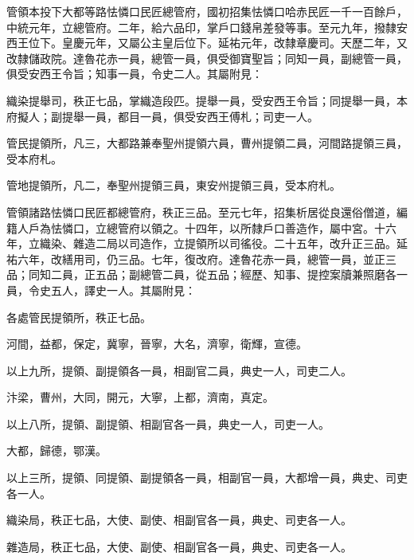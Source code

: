 \begin{pinyinscope}
 管領本投下大都等路怯憐口民匠總管府，國初招集怯憐口哈赤民匠一千一百餘戶，中統元年，立總管府。二年，給六品印，掌戶口錢帛差發等事。至元九年，撥隸安西王位下。皇慶元年，又屬公主皇后位下。延祐元年，改隸章慶司。天歷二年，又改隸儲政院。達魯花赤一員，總管一員，俱受御寶聖旨；同知一員，副總管一員，俱受安西王令旨；知事一員，令史二人。其屬附見：



 織染提舉司，秩正七品，掌織造段匹。提舉一員，受安西王令旨；同提舉一員，本府擬人；副提舉一員，都目一員，俱受安西王傅札；司吏一人。



 管民提領所，凡三，大都路兼奉聖州提領六員，曹州提領二員，河間路提領三員，受本府札。



 管地提領所，凡二，奉聖州提領三員，東安州提領三員，受本府札。



 管領諸路怯憐口民匠都總管府，秩正三品。至元七年，招集析居從良還俗僧道，編籍人戶為怯憐口，立總管府以領之。十四年，以所隸戶口善造作，屬中宮。十六年，立織染、雜造二局以司造作，立提領所以司徭役。二十五年，改升正三品。延祐六年，改繕用司，仍三品。七年，復改府。達魯花赤一員，總管一員，並正三品；同知二員，正五品；副總管二員，從五品；經歷、知事、提控案牘兼照磨各一員，令史五人，譯史一人。其屬附見：



 各處管民提領所，秩正七品。



 河間，益都，保定，冀寧，晉寧，大名，濟寧，衛輝，宣德。



 以上九所，提領、副提領各一員，相副官二員，典史一人，司吏二人。



 汴梁，曹州，大同，開元，大寧，上都，濟南，真定。



 以上八所，提領、副提領、相副官各一員，典史一人，司吏一人。



 大都，歸德，鄂漢。



 以上三所，提領、同提領、副提領各一員，相副官一員，大都增一員，典史、司吏各一人。



 織染局，秩正七品，大使、副使、相副官各一員，典史、司吏各一人。



 雜造局，秩正七品，大使、副使、相副官各一員，典史、司吏各一人。




\end{pinyinscope}
